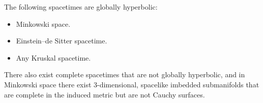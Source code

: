 The following spacetimes are globally hyperbolic:
\begin{itemize}
\item[(a)] Minkowski space.
\item[(b)] Einstein--de Sitter spacetime.
\item[(c)] Any Kruskal spacetime.
\end{itemize}
There also exist complete spacetimes that are not globally hyperbolic, and in Minkowski space there exist 3-dimensional, spacelike imbedded submanifolds that are complete in the induced metric but are not Cauchy surfaces.

